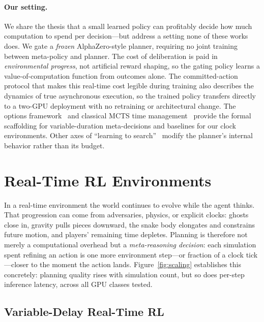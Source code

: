 \paragraph{Our setting.}
We share the thesis that a small learned policy can profitably decide how much
computation to spend per decision—but address a setting none of these works
does.
We gate a \emph{frozen} AlphaZero-style planner, requiring no joint training
between meta-policy and planner.
The cost of deliberation is paid in \emph{environmental progress}, not
artificial reward shaping, so the gating policy learns a value-of-computation
function from outcomes alone.
The committed-action protocol that makes this real-time cost legible during
training also describes the dynamics of true asynchronous execution, so the
trained policy transfers directly to a two-GPU deployment with no retraining
or architectural change.
The options framework~\citep{sutton1999between,bradtke1994reinforcement,
bacon2017optioncritic,harb2018deliberation} and classical MCTS time
management~\citep{baier2016time,huang2010timemanagement,baudis2012pachi}
provide the formal scaffolding for variable-duration meta-decisions and
baselines for our clock environments.
Other axes of ``learning to search''~\citep{guez2018mctsnets,farquhar2018treeqn,
hamrick2020save,racaniere2017i2a} modify the planner's internal behavior rather
than its budget.

\section{Real-Time RL Environments}
\label{sec:envs}

In a real-time environment the world continues to evolve while the agent
thinks.
That progression can come from adversaries, physics, or explicit clocks:
ghosts close in, gravity pulls pieces downward, the snake body elongates and
constrains future motion, and players' remaining time depletes.
Planning is therefore not merely a computational overhead but a
\emph{meta-reasoning decision}: each simulation spent refining an action is
one more environment step—or fraction of a clock tick—closer to the moment
the action lands.
Figure~\ref{fig:scaling} establishes this concretely: planning quality rises
with simulation count, but so does per-step inference latency, across all GPU
classes tested.

\subsection{Variable-Delay Real-Time RL}
\label{sec:variable_delay}

